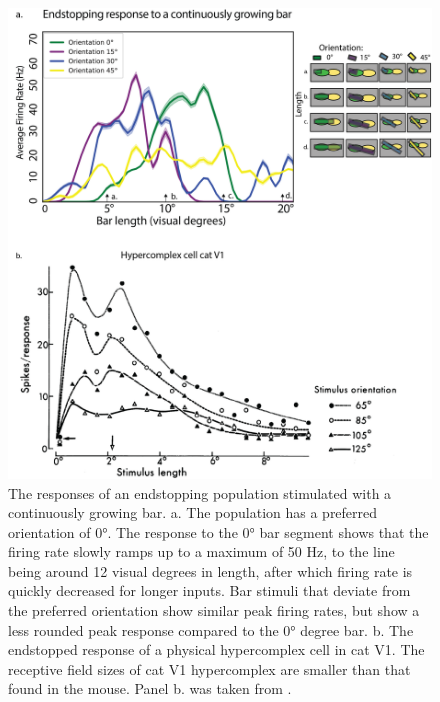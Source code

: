\documentclass[12pt]{article}
\begin{document}
  \begin{figure}[H]
    \centering
    \includegraphics[width=1.0 \textwidth]{adjusted_figures/endstop_line_length_physiology.png}
    \caption{The responses of an endstopping population stimulated with a continuously growing bar. a. The population has a preferred orientation of 0°. The response to the 0° bar segment shows that the firing rate slowly ramps up to a maximum of 50 Hz, to the line being around 12 visual degrees in length, after which firing rate is quickly decreased for longer inputs. Bar stimuli that deviate from the preferred orientation show similar peak firing rates, but show a less rounded peak response compared to the 0° degree bar. b. The endstopped response of a physical hypercomplex cell in cat V1. The receptive field sizes of cat V1 hypercomplex are smaller than that found in the mouse. Panel b. was taken from \textcite{orbanDimensionsPropertiesEndzone1979}.}
    \label{fig:endstopping_length}
  \end{figure}
\end{document}
